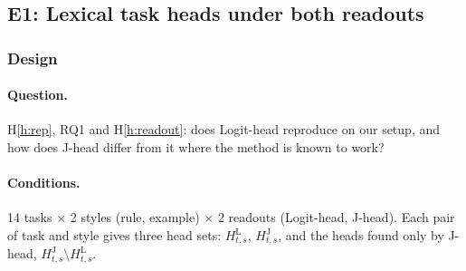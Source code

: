 \documentclass[11pt,a4paper]{article}
\begin{document}
\subsection{E1: Lexical task heads under both readouts}\label{sec:e1}
\subsubsection{Design}
\paragraph{Question.} H\ref{h:rep}, RQ1 and H\ref{h:readout}: does Logit-head reproduce \citet{yang2026shared} on our setup, and how does J-head differ from it where the method is known to work?

\paragraph{Conditions.} 14 tasks $\times$ 2 styles (rule, example) $\times$ 2 readouts (Logit-head, J-head). Each pair of task and style gives three head sets: $H^{\mathrm{L}}_{t,s}$, $H^{\mathrm{J}}_{t,s}$, and the heads found only by J-head, $H^{\mathrm{J}}_{t,s}\setminus H^{\mathrm{L}}_{t,s}$.
\end{document}
